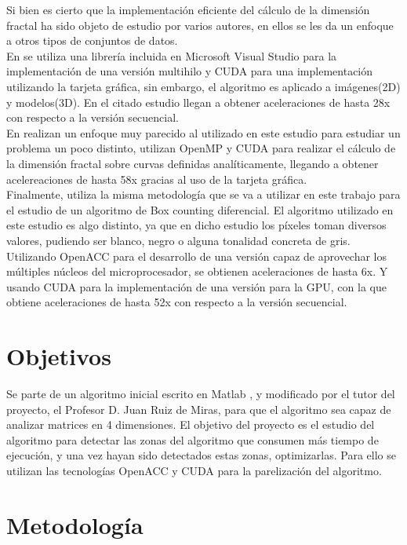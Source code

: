 Si bien es cierto que la implementación eficiente del cálculo de la dimensión fractal ha sido objeto de estudio por varios autores, en ellos se les da un enfoque a otros tipos de conjuntos de datos.\\ En \cite{JIMENEZ20121229} se utiliza una librería incluida en Microsoft Visual Studio para la implementación de una versión multihilo y CUDA para una implementación utilizando la tarjeta gráfica, sin embargo, el algoritmo es aplicado a imágenes(2D) y modelos(3D). En el citado estudio llegan a obtener aceleraciones de hasta 28x con respecto a la versión secuencial. 
\\
En \cite{10.1007/978-3-030-64616-5_8} realizan un enfoque muy parecido al utilizado en este estudio para estudiar un problema un poco distinto, utilizan OpenMP y CUDA para realizar el cálculo de la dimensión fractal sobre curvas definidas analíticamente, llegando a obtener acelereaciones de hasta 58x gracias al uso de la tarjeta gráfica.
\\
Finalmente, \cite{de2020fast} utiliza la misma metodología que se va a utilizar en este trabajo para el estudio de un algoritmo de Box counting diferencial. El algoritmo utilizado en este estudio es algo distinto, ya que en dicho estudio los píxeles toman diversos valores, pudiendo ser blanco, negro o alguna tonalidad concreta de gris. Utilizando OpenACC para el desarrollo de una versión capaz de aprovechar los múltiples núcleos del microprocesador, se obtienen aceleraciones de hasta 6x. Y usando CUDA para la implementación de una versión para la GPU, con la que obtiene aceleraciones de hasta 52x con respecto a la versión secuencial.

\section{Objetivos}

Se parte de un algoritmo inicial escrito en Matlab \cite{unknown-author-2008}, y modificado por el tutor del proyecto, el Profesor D. Juan Ruiz de Miras, para que el algoritmo sea capaz de analizar matrices en 4 dimensiones. El objetivo del proyecto es el estudio del algoritmo para detectar las zonas del algoritmo que consumen más tiempo de ejecución, y una vez hayan sido detectados estas zonas, optimizarlas. Para ello se utilizan las tecnologías OpenACC y CUDA para la parelización del algoritmo.\\

\section{Metodología}

